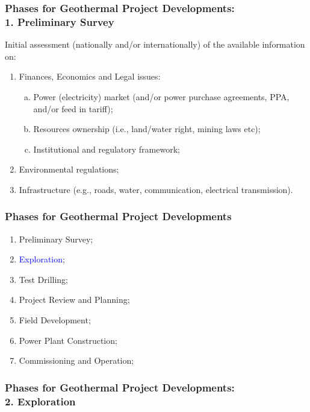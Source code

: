 \documentclass[10pt,compress]{beamer}
\newcommand{\blue}{\textcolor{blue}}
\begin{document}
\begin{frame}
\begin{frame}
 \frametitle{Phases for Geothermal Project Developments: \\1. Preliminary Survey} 

    Initial assessment (nationally and/or internationally) of the available information on:
    \begin{enumerate}[{1.}1]
       \item <1-> Finances, Economics and Legal issues:
          \begin{enumerate}[(a)]
             \item<2-> Power (electricity) market (and/or power purchase agreements, PPA, and/or feed in tariff);
             \item<2-> Resources ownership (i.e., land/water right, mining laws etc);
             \item<2-> Institutional and regulatory framework;
          \end{enumerate}
       \item <3-> Environmental regulations; 
       \item <4-> Infrastructure (e.g., roads, water, communication, electrical transmission).
    \end{enumerate}
\end{frame}

\begin{frame}
 \frametitle{Phases for Geothermal Project Developments} 
    \begin{enumerate}[1.]
       \item <1-> Preliminary Survey;
       \item <2-> \blue{Exploration}; 
       \item <1-> Test Drilling;
       \item <1-> Project Review and Planning;
       \item <1-> Field Development; 
       \item <1-> Power Plant Construction;
       \item <1-> Commissioning and Operation;
    \end{enumerate}
\end{frame}

\begin{frame}
 \frametitle{Phases for Geothermal Project Developments: \\ 2. Exploration} 


\end{frame}
\end{frame}
\end{document}
